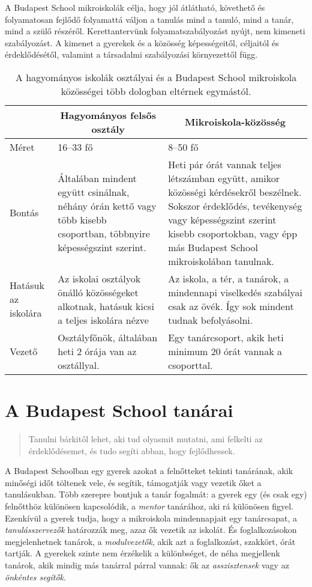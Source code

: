   A Budapest School mikroiskolák célja, hogy jól átlátható, követhető és
  folyamatosan fejlődő folyamattá váljon a tanulás mind a tanuló, mind a tanár, mind
  a szülő részéről. Kerettantervünk folyamatszabályozást nyújt, nem kimeneti
  szabályozást. A kimenet a gyerekek és a közösség képességeitől, céljaitól és érdeklődésétől,
  valamint a társadalmi szabályozási környezettől függ.


  \begin{table}
  \centering
\begin{tabular}{@{}p{2cm}|p{4cm}|p{4cm}@{}}


 & \multicolumn{1}{c|}{\textbf{Hagyományos felsős osztály}}  & \multicolumn{1}{c}{\textbf{ Mikroiskola-közösség}}
 \\ \hline
Méret & 16–33 fő & 8–50 fő \\ \hline
  Bontás &
  Általában mindent együtt csinálnak, néhány órán kettő vagy több kisebb
  csoportban, többnyire képességszint szerint. &
  Heti pár órát vannak teljes létszámban együtt, amikor közösségi
  kérdésekről beszélnek. Sokszor érdeklődés, tevékenység vagy képességszint
  szerint kisebb csoportokban, vagy épp más Budapest School
  mikroiskolában tanulnak. \\ \hline
Hatásuk az iskolára & Az iskolai osztályok önálló közösségeket alkotnak, hatásuk
kicsi a teljes iskolára nézve & Az iskola, a tér, a tanárok,
a mindennapi viselkedés szabályai csak az övék.
Így sok mindent tudnak befolyásolni. \\ \hline
Vezető & Osztályfőnök, általában heti 2 órája van az osztállyal. &
Egy tanárcsoport, akik heti minimum 20 órát vannak a csoporttal. \\
\end{tabular}
\caption{A hagyományos iskolák osztályai és a Budapest School mikroiskola közösségei több dologban eltérnek egymástól.}

\label{my-label}

\end{table}


  \section{A Budapest School tanárai}
  \begin{quote}

    Tanulni bárkitől lehet, aki tud olyasmit mutatni, ami felkelti az
    érdeklődésemet, és tudo segíti abban, hogy fejlődhessek.
\end{quote}
A Budapest Schoolban egy gyerek azokat a felnőtteket tekinti tanárának, akik minőségi időt töltenek vele, és segítik, támogatják vagy vezetik őket a tanulásukban. Több szerepre bontjuk a tanár fogalmát: a gyerek egy (és csak egy) felnőtthöz különösen kapcsolódik, a \emph{mentor} tanárához, aki rá különösen figyel. Ezenkívül a gyerek tudja, hogy a mikroiskola mindennapjait egy tanárcsapat, a \emph{tanulásszervezők} határozzák meg, azaz ők vezetik az iskolát.  És foglalkozásokon megjelenhetnek tanárok, a \emph{modulvezetők}, akik azt a foglalkozást, szakkört, órát tartják. A gyerekek szinte nem érzékelik a különbséget, de néha megjellenk tanárok, akik mindig más tanárral párral vannak: ők az \emph{asszisztensek} vagy az \emph{önkéntes segítők}.

